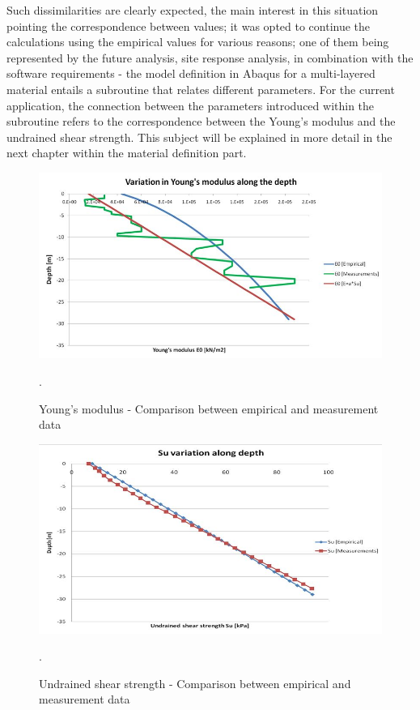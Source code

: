 \documentclass[10pt,a4paper]{report}
\begin{document}
Such dissimilarities are clearly expected, the main interest in this situation pointing the correspondence between values; it was opted to continue the calculations using the empirical values for various reasons; one of them being represented by the future analysis, site response analysis, in combination with the software requirements - the model definition in Abaqus for a multi-layered material entails a subroutine that relates different parameters. For the current application, the connection between the parameters introduced within the subroutine refers to the correspondence between the Young's modulus and the undrained shear strength. This subject will be explained in more detail in the next chapter within the material definition part. 
\begin{figure}
	\centering
	\includegraphics[width=0.7\linewidth]{"youngss1"}
	\caption{Young's modulus - Comparison between empirical and measurement data}
	\label{youngss}.
\end{figure}

\begin{figure}
	\centering
	\includegraphics[width=0.7\linewidth]{"su2"}
	\caption{Undrained shear strength - Comparison between empirical and measurement data}
	\label{Su2}.
\end{figure}
\end{document}

